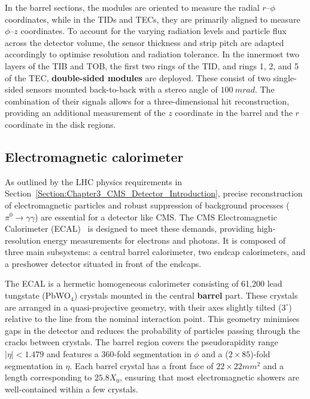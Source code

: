 In the barrel sections, the modules are oriented to measure the radial $r$--$\phi$ coordinates, while in the TIDs and TECs, they are primarily aligned to measure $\phi$--$z$ coordinates. To account for the varying radiation levels and particle flux across the detector volume, the sensor thickness and strip pitch are adapted accordingly to optimise resolution and radiation tolerance. In the innermost two layers of the TIB and TOB, the first two rings of the TID, and rings 1, 2, and 5 of the TEC, \textbf{double-sided modules} are deployed. These consist of two single-sided sensors mounted back-to-back with a stereo angle of $100~\unit{mrad}$. The combination of their signals allows for a three-dimensional hit reconstruction, providing an additional measurement of the $z$ coordinate in the barrel and the $r$ coordinate in the disk regions.

\subsection{Electromagnetic calorimeter}

As outlined by the LHC physics requirements in Section~\ref{Section:Chapter3_CMS_Detector_Introduction}, precise reconstruction of electromagnetic particles and robust suppression of background processes ($\pi^0 \to \gamma \gamma$) are essential for a detector like CMS. The CMS Electromagnetic Calorimeter (ECAL)~\cite{LHC_CMS,CMS_Detector_Run3,CMS_ECAL_Performance_Run2} is designed to meet these demands, providing high-resolution energy measurements for electrons and photons. It is composed of three main subsystems: a central barrel calorimeter, two endcap calorimeters, and a preshower detector situated in front of the endcaps.

The ECAL is a hermetic homogeneous calorimeter consisting of 61,200 lead tungstate (PbWO$_4$) crystals mounted in the central \textbf{barrel} part. These crystals are arranged in a quasi-projective geometry, with their axes slightly tilted ($3^\circ$) relative to the line from the nominal interaction point. This geometry minimises gaps in the detector and reduces the probability of particles passing through the cracks between crystals. The barrel region covers the pseudorapidity range $|\eta| < 1.479$ and features a 360-fold segmentation in $\phi$ and a ($2 \times 85$)-fold segmentation in $\eta$. Each barrel crystal has a front face of $22 \times 22\unit{mm}^2$ and a length corresponding to $25.8 X_0$, ensuring that most electromagnetic showers are well-contained within a few crystals.

